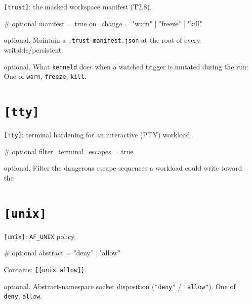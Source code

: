 \texttt{{[}trust{]}}: the masked workspace manifest (T2.8).

\begin{kennelcode}
[trust]
# optional
manifest = true
on_change = "warn" | "freeze" | "kill"
\end{kennelcode}

\begin{description}
\tightlist
\item[\texttt{manifest}]
optional. Maintain a \texttt{.trust-manifest.json} at the root of every
writable/persistent
\item[\texttt{on\_change}]
optional. What \texttt{kenneld} does when a watched trigger is mutated
during the run: One of \texttt{warn}, \texttt{freeze}, \texttt{kill}.
\end{description}

\hypertarget{tty}{%
\section{\texorpdfstring{\texttt{{[}tty{]}}}{{[}tty{]}}}\label{tty}}

\texttt{{[}tty{]}}: terminal hardening for an interactive (PTY)
workload.

\begin{kennelcode}
[tty]
# optional
filter_terminal_escapes = true
\end{kennelcode}

\begin{description}
\tightlist
\item[\texttt{filter\_terminal\_escapes}]
optional. Filter the dangerous escape sequences a workload could write
toward the
\end{description}

\hypertarget{unix}{%
\section{\texorpdfstring{\texttt{{[}unix{]}}}{{[}unix{]}}}\label{unix}}

\texttt{{[}unix{]}}: \texttt{AF\_UNIX} policy.

\begin{kennelcode}
[unix]
# optional
abstract = "deny" | "allow"
\end{kennelcode}

Contains: \texttt{{[}{[}unix.allow{]}{]}}.

\begin{description}
\tightlist
\item[\texttt{abstract}]
optional. Abstract-namespace socket disposition (\texttt{"deny"} /
\texttt{"allow"}). One of \texttt{deny}, \texttt{allow}.
\end{description}

